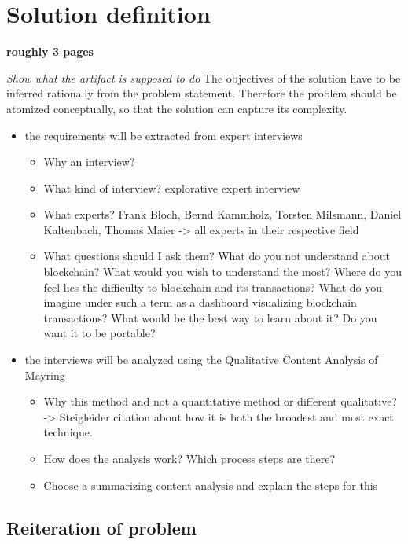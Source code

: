 \chapter{Solution definition} \label{chapter:Solution}
\textbf{roughly 3 pages}

\textit{Show what the artifact is supposed to do}
The objectives of the solution have to be inferred rationally from the problem statement. Therefore the problem should be atomized conceptually, so that the solution can capture its complexity.

\begin{itemize}
    \item the requirements will be extracted from expert interviews
    \begin{itemize}
        \item Why an interview?
        \item What kind of interview? explorative expert interview
        \item What experts? Frank Bloch, Bernd Kammholz, Torsten Milsmann, Daniel Kaltenbach, Thomas Maier -> all experts in their respective field
        \item What questions should I ask them? What do you not understand about blockchain? What would you wish to understand the most? Where do you feel lies the difficulty to blockchain and its transactions? What do you imagine under such a term as a dashboard visualizing blockchain transactions? What would be the best way to learn about it? Do you want it to be portable?
    \end{itemize}
    \item the interviews will be analyzed using the Qualitative Content Analysis of Mayring
    \begin{itemize}
        \item Why this method and not a quantitative method or different qualitative? -> Steigleider citation about how it is both the broadest and most exact technique. 
        \item How does the analysis work? Which process steps are there?
        \item Choose a summarizing content analysis and explain the steps for this
    \end{itemize}
\end{itemize}

\section{Reiteration of problem}

